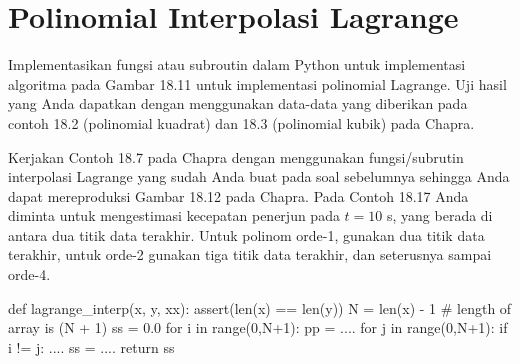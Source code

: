 \section{Polinomial Interpolasi Lagrange}
\begin{soal}
Implementasikan fungsi atau subroutin dalam Python untuk implementasi algoritma
pada Gambar 18.11 untuk implementasi polinomial Lagrange.
Uji hasil yang Anda dapatkan dengan menggunakan data-data yang diberikan pada contoh
18.2 (polinomial kuadrat) dan 18.3 (polinomial kubik) pada Chapra.
\end{soal}

\begin{soal}
Kerjakan Contoh 18.7 pada Chapra dengan menggunakan fungsi/subrutin interpolasi Lagrange
yang sudah Anda buat pada soal sebelumnya sehingga Anda dapat mereproduksi Gambar 18.12
pada Chapra. Pada Contoh 18.17 Anda diminta untuk mengestimasi kecepatan penerjun
pada $t=10$ s, yang berada di antara dua titik data terakhir.
Untuk polinom orde-1, gunakan dua titik data terakhir, untuk orde-2 gunakan tiga titik
data terakhir, dan seterusnya sampai orde-4.
\end{soal}

\begin{pythoncode}
def lagrange_interp(x, y, xx):
    assert(len(x) == len(y))
    N = len(x) - 1  # length of array is (N + 1)
    ss = 0.0
    for i in range(0,N+1):
        pp = ....
        for j in range(0,N+1):
            if i != j:
                ....
        ss = ....
    return ss
\end{pythoncode}